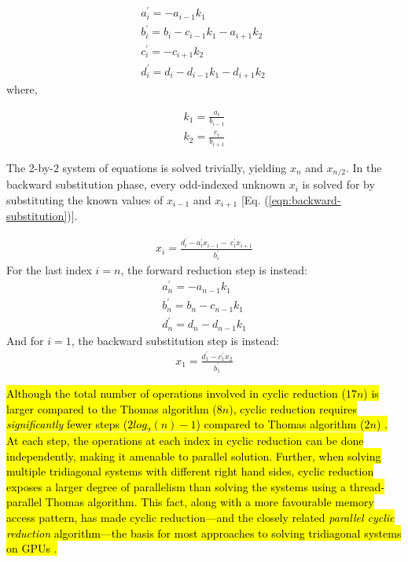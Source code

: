 \documentclass{elsarticle}
\begin{document}
\begin{align} 
& a^{\prime}_i = -a_{i-1}k_1 \
    \label{eqn:forward-reduction-1}& \\
& b^{\prime}_i = b_i - c_{i-1}k_1 - a_{i+1}k_2 \
    \label{eqn:forward-reduction-2}& \\
& c^{\prime}_i = -c_{i+1}k_2 \
    \label{eqn:forward-reduction-3}& \\
& d^{\prime}_i = d_i - d_{i-1}k_1  - d_{i+1}k_2 \
    \label{eqn:forward-reduction-4}&
\end{align}
%
where,

\begin{align}
& k_1 = \frac{a_i}{b_{i-1}} \label{eqn:k1-update}& \\
& k_2 = \frac{c_i}{b_{i+1}} \label{eqn:k2-update}&
\end{align}

The 2-by-2 system of equations is solved trivially,
yielding $x_n$ and $x_{n/2}$.
In the backward substitution phase,
every odd-indexed unknown $x_i$ is solved for by
substituting the known values of $x_{i-1}$ and $x_{i+1}$
[Eq. (\ref{eqn:backward-substitution})].

\begin{align} \label{eqn:backward-substitution}
x_i = \frac{d^{\prime}_i - a^{\prime}_ix_{i-1} - \
    c^{\prime}_ix_{i+1}}{b^{\prime}_i}
\end{align}
%
For the last index $i=n$,
the forward reduction step is instead:
\begin{align} \label{eqn:forward-reduction-last}
    & a^{\prime}_n = -a_{n-1}k_1 & \\
    & b^{\prime}_n = b_n - c_{n-1}k_1 & \\
    & d^{\prime}_n = d_n - d_{n-1}k_1&
\end{align}
%
And for $i=1$, the backward substitution step is instead:
\begin{align} \label{eqn:backward-substitution-first}
x_1 = \frac{d^{\prime}_1 - c^{\prime}_1x_{2}}{b^{\prime}_1}
\end{align}

\hl{
Although the total number of operations involved in cyclic reduction ($17n$)
is larger compared to the Thomas algorithm ($8n$),
cyclic reduction requires \emph{significantly} fewer steps
($2log_2(n) - 1$) compared to Thomas algorithm ($2n$) \cite{Zhang2010FTS}.
At each step, the operations at each index in cyclic reduction
can be done independently,
making it amenable to parallel solution.
Further, when solving multiple tridiagonal systems with different right hand sides,
cyclic reduction exposes a larger degree of parallelism
than solving the systems using a thread-parallel Thomas algorithm.
This fact, along with a more favourable memory access pattern,
has made cyclic reduction---and the
closely related \emph{parallel cyclic reduction} algorithm---the
basis for most approaches to solving tridiagonal systems on GPUs \cite{chang2014guide}.
}
\end{document}
